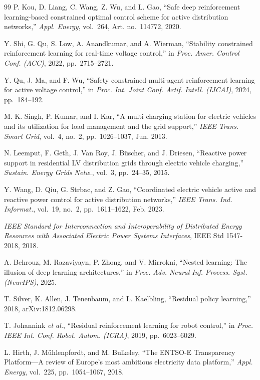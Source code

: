 \begin{thebibliography}{99}
 P. Kou, D. Liang, C. Wang, Z. Wu, and L. Gao, ``Safe deep reinforcement learning-based constrained optimal control scheme for active distribution networks,'' \emph{Appl. Energy}, vol.~264, Art. no.~114772, 2020.

 Y. Shi, G. Qu, S. Low, A. Anandkumar, and A. Wierman, ``Stability constrained reinforcement learning for real-time voltage control,'' in \emph{Proc. Amer. Control Conf. (ACC)}, 2022, pp.~2715--2721.

 Y. Qu, J. Ma, and F. Wu, ``Safety constrained multi-agent reinforcement learning for active voltage control,'' in \emph{Proc. Int. Joint Conf. Artif. Intell. (IJCAI)}, 2024, pp.~184--192.

 M. K. Singh, P. Kumar, and I. Kar, ``A multi charging station for electric vehicles and its utilization for load management and the grid support,'' \emph{IEEE Trans. Smart Grid}, vol.~4, no.~2, pp.~1026--1037, Jun. 2013.

 N. Leemput, F. Geth, J. Van Roy, J. B{\"u}scher, and J. Driesen, ``Reactive power support in residential LV distribution grids through electric vehicle charging,'' \emph{Sustain. Energy Grids Netw.}, vol.~3, pp.~24--35, 2015.

 Y. Wang, D. Qiu, G. Strbac, and Z. Gao, ``Coordinated electric vehicle active and reactive power control for active distribution networks,'' \emph{IEEE Trans. Ind. Informat.}, vol.~19, no.~2, pp.~1611--1622, Feb. 2023.

 \emph{IEEE Standard for Interconnection and Interoperability of Distributed Energy Resources with Associated Electric Power Systems Interfaces}, IEEE Std 1547-2018, 2018.

 A. Behrouz, M. Razaviyayn, P. Zhong, and V. Mirrokni, ``Nested learning: The illusion of deep learning architectures,'' in \emph{Proc. Adv. Neural Inf. Process. Syst. (NeurIPS)}, 2025.

 T. Silver, K. Allen, J. Tenenbaum, and L. Kaelbling, ``Residual policy learning,'' 2018, arXiv:1812.06298.

 T. Johannink \emph{et al.}, ``Residual reinforcement learning for robot control,'' in \emph{Proc. IEEE Int. Conf. Robot. Autom. (ICRA)}, 2019, pp.~6023--6029.

 L. Hirth, J. M{\"u}hlenpfordt, and M. Bulkeley, ``The ENTSO-E Transparency Platform---A review of Europe's most ambitious electricity data platform,'' \emph{Appl. Energy}, vol.~225, pp.~1054--1067, 2018.


\end{thebibliography}
